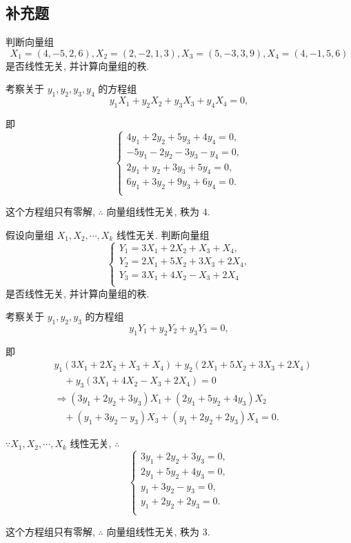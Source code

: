 \documentclass[color=black,device=normal,lang=cn,mode=geye]{elegantnote}
\begin{document}
\subsection{补充题}
\begin{exercisec}[3.1.3(4)]
    判断向量组
    \[X_1=(4,-5,2,6),X_2=(2,-2,1,3),X_3=(5,-3,3,9),X_4=(4,-1,5,6)\]
    是否线性无关, 并计算向量组的秩.
\end{exercisec}
\begin{solution}
    考察关于 $y_1,y_2,y_3,y_4$ 的方程组
    \[y_1X_1+y_2X_2+y_3X_3+y_4X_4=0,\]

    即
    \[\begin{cases}
        4y_1+2y_2+5y_3+4y_4=0, \\
        -5y_1-2y_2-3y_3-y_4=0, \\
        2y_1+y_2+3y_3+5y_4=0, \\
        6y_1+3y_2+9y_3+6y_4=0. \\
    \end{cases}\]

    这个方程组只有零解, $\therefore$ 向量组线性无关, 秩为 $4$.
\end{solution}
\begin{exercisec}[3.1.4(1)]
    假设向量组 $X_1,X_2,\cdots,X_k$ 线性无关. 判断向量组
    \[\begin{cases}
        Y_1=3X_1+2X_2+X_3+X_4, \\
        Y_2=2X_1+5X_2+3X_3+2X_4, \\
        Y_3=3X_1+4X_2-X_3+2X_4 \\
    \end{cases}\]
    是否线性无关, 并计算向量组的秩.
\end{exercisec}
\begin{solution}
    考察关于 $y_1,y_2,y_3$ 的方程组
    \[y_1Y_1+y_2Y_2+y_3Y_3=0,\]
    
    即
    \begin{align*}
        & y_1(3X_1+2X_2+X_3+X_4)+y_2(2X_1+5X_2+3X_3+2X_4) \\
        & \quad+y_3(3X_1+4X_2-X_3+2X_4)=0 \\
        & \Rightarrow(3y_1+2y_2+3y_3)X_1+(2y_1+5y_2+4y_3)X_2 \\
        & \quad+(y_1+3y_2-y_3)X_3+(y_1+2y_2+2y_3)X_4=0.
    \end{align*}

    $\because X_1,X_2,\cdots,X_k$ 线性无关, $\therefore$
    \[\begin{cases}
        3y_1+2y_2+3y_3=0, \\
        2y_1+5y_2+4y_3=0, \\
        y_1+3y_2-y_3=0, \\
        y_1+2y_2+2y_3=0. \\
    \end{cases}\]

    这个方程组只有零解, $\therefore$ 向量组线性无关, 秩为 $3$.
\end{solution}
\end{document}
